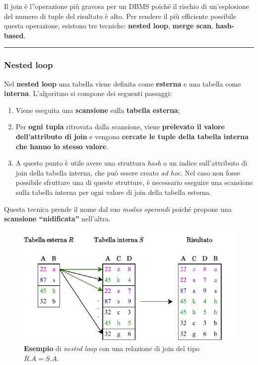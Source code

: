 \documentclass[a4paper]{article}
\newcommand{\longline}{\noindent\rule{\textwidth}{0.4pt}}
\newcommand{\dquotes}[1]{``#1''}
\begin{document}
	Il join è l''operazione più gravosa per un DBMS poiché il rischio di un'esplosione del numero di tuple del risultato è alto. Per rendere il più efficiente possibile questa operazione, esistono tre tecniche: \textbf{nested loop}, \textbf{merge scan}, \textbf{hash-based}.
	
	\longline
	
	\subsubsection{Nested loop}
	
	Nel \textcolor{Red3}{\textbf{nested loop}} una tabella viene definita come \textbf{esterna} e una tabella come \textbf{interna}. L'algoritmo si compone dei seguenti passaggi:
	\begin{enumerate}
		\item Viene eseguita una \textbf{scansione} sulla \textbf{tabella esterna};
		
		\item Per \textbf{ogni tupla} ritrovata dalla scansione, viene \textbf{prelevato il valore dell'attributo di join} e vengono \textbf{cercate le tuple della tabella interna che hanno lo stesso valore}.
		
		\item A questo punto è utile avere una struttura \emph{hash} o un indice sull'attributo di join della tabella interna, che può essere creato \emph{ad hoc}. Nel caso non fosse possibile sfruttare una di queste strutture, è necessario eseguire una scansione sulla tabella interna per ogni valore di join della tabella esterna.
	\end{enumerate}
	Questa tecnica prende il nome dal suo \emph{modus operandi} poiché propone una \textbf{scansione \dquotes{nidificata}} nell'altra.
	\begin{figure}[!htp]
		\centering
		\includegraphics[width=\textwidth]{img/nested-loop.pdf}
		\caption{\textcolor{Green4}{\textbf{Esempio}} di \emph{nested loop} con una relazione di join del tipo $R.A = S.A$.}
	\end{figure}\newpage
\end{document}
